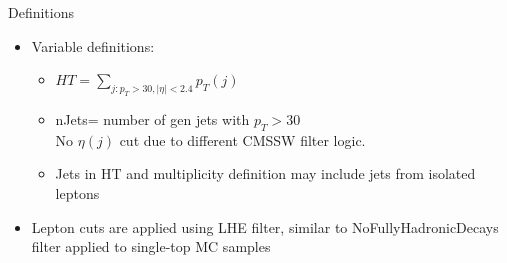 \documentclass[xcolor=table]{beamer}
\begin{document}
\begin{frame}{Definitions}

\begin{itemize}
\item Variable definitions:
\begin{itemize}
\item $HT=\sum\limits_{j:p_T>30,|\eta|<2.4} {p_T(j)}$
\item nJets= number of gen jets with $p_T>30$\\
No $\eta(j)$ cut due to different CMSSW filter logic.
\item Jets in HT and multiplicity definition may include jets from isolated leptons
\end{itemize}
\item Lepton cuts are applied using LHE filter, similar to NoFullyHadronicDecays filter applied to single-top MC samples
\end{itemize}

\end{frame}
%
%
\end{document}
